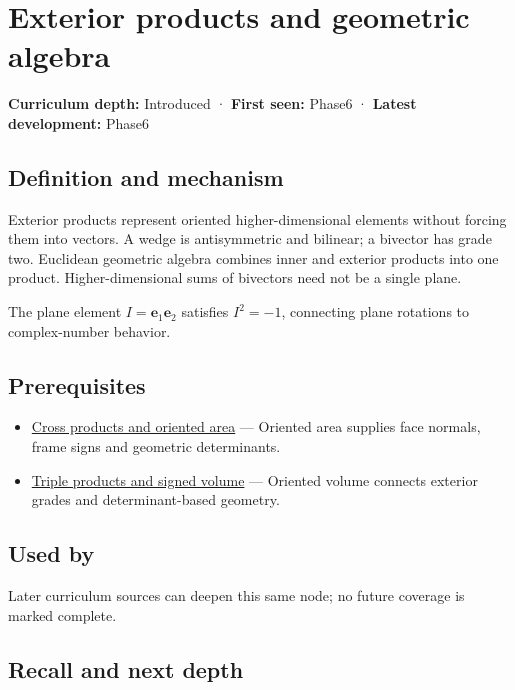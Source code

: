 \hypertarget{appendix-e1960925d1b8}{}\label{referencestart:appendix-e1960925d1b8}
\section{Exterior products and geometric algebra}\label{appendix-e1960925d1b8-exterior-products-and-geometric-algebra}

\textbf{Curriculum depth:} Introduced · \textbf{First seen:} Phase6 · \textbf{Latest development:} Phase6

\subsection{Definition and mechanism}\label{appendix-e1960925d1b8-definition-and-mechanism}

Exterior products represent oriented higher-dimensional elements without forcing them into vectors. A wedge is antisymmetric and bilinear; a bivector has grade two. Euclidean geometric algebra combines inner and exterior products into one product. Higher-dimensional sums of bivectors need not be a single plane.

The plane element \(I=\mathbf e_1\mathbf e_2\) satisfies \(I^2=-1\), connecting plane rotations to complex-number behavior.

\subsection{Prerequisites}\label{appendix-e1960925d1b8-prerequisites}

\begin{itemize}
\tightlist
\item
  \hyperref[appendix-2391db8052b1]{Cross products and oriented area} --- Oriented area supplies face normals, frame signs and geometric determinants.
\item
  \hyperref[appendix-5caa058bd9c7]{Triple products and signed volume} --- Oriented volume connects exterior grades and determinant-based geometry.
\end{itemize}

\subsection{Used by}\label{appendix-e1960925d1b8-used-by}

Later curriculum sources can deepen this same node; no future coverage is marked complete.

\subsection{Recall and next depth}\label{appendix-e1960925d1b8-recall-and-next-depth}


